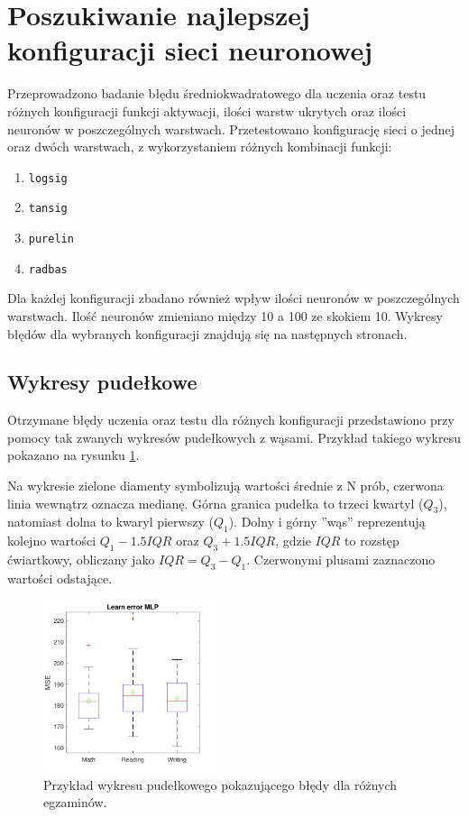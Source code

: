 \documentclass[12pt]{article}
\begin{document}
\section{Poszukiwanie najlepszej konfiguracji sieci neuronowej}
Przeprowadzono badanie błędu średniokwadratowego dla uczenia oraz testu różnych konfiguracji funkcji aktywacji, ilości warstw ukrytych oraz ilości neuronów w poszczególnych warstwach.
Przetestowano konfigurację sieci o jednej oraz dwóch warstwach, z wykorzystaniem różnych kombinacji funkcji:
\begin{enumerate}
\item \verb+logsig+
\item \verb+tansig+
\item \verb+purelin+
\item \verb+radbas+
\end{enumerate}
Dla każdej konfiguracji zbadano również wpływ ilości neuronów w poszczególnych warstwach. Ilość neuronów zmieniano między  10 a 100 ze skokiem 10. Wykresy błędów dla wybranych konfiguracji znajdują się na następnych stronach.

\subsection{Wykresy pudełkowe}
Otrzymane błędy uczenia oraz testu dla różnych konfiguracji przedstawiono przy pomocy tak zwanych wykresów pudełkowych z wąsami. Przykład takiego wykresu pokazano na rysunku \ref{fig:exampleBoxplot}.


Na wykresie zielone diamenty symbolizują wartości średnie z N prób, czerwona linia wewnątrz oznacza medianę. Górna granica pudełka to trzeci kwartyl ($Q_3$), natomiast dolna to kwaryl pierwszy ($Q_1$). Dolny i górny ''wąs'' reprezentują kolejno wartości $Q_1 - 1.5 IQR$ oraz  $Q_3 +  1.5 IQR$, gdzie $IQR$ to rozstęp ćwiartkowy, obliczany jako $IQR = Q_3 - Q_1$. Czerwonymi plusami zaznaczono wartości odstające.


\begin{figure}[H]
\centering
\includegraphics[width=0.45\textwidth]{tansig_purelin_20_learnBoxplot.pdf}
\caption{Przykład wykresu pudełkowego pokazującego błędy dla różnych egzaminów.} \label{fig:exampleBoxplot}
\end{figure}
\end{document}
